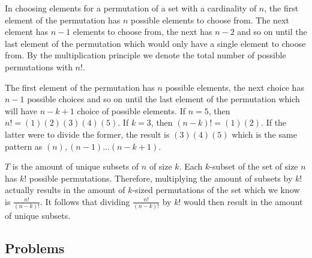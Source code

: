 \documentclass[12pt]{report}
\begin{document}
In choosing elements for a permutation of a set with a cardinality of $n$, the first element of the permutation has $n$ possible elements to choose from. The next element has $n-1$ elements to choose from, the next has $n-2$ and so on until the last element of the permutation which would only have a single element to choose from. By the multiplication principle we denote the total number of possible permutations with $n!$.\medskip

\medskip

The first element of the permutation has $n$ possible elements, the next choice has $n-1$ possible choices and so on until the last element of the permutation which will have $n-k+1$ choice of possible elements. If $n=5$, then $n!=(1)(2)(3)(4)(5)$. If $k=3$, then $(n-k)!=(1)(2)$. If the latter were to divide the former, the result is $(3)(4)(5)$ which is the same pattern as $(n),(n-1) \dots (n-k+1)$.\bigskip

\bigskip

$T$ is the amount of unique subsets of $n$ of size $k$. Each $k$-subset of the set of size $n$ has $k!$ possible permutations. Therefore, multiplying the amount of subsets by $k!$ actually results in the amount of $k$-sized permutations of the set which we know is $\frac{n!}{(n-k)!}$. It follows that dividing $\frac{n!}{(n-k)!}$ by $k!$ would then result in the amount of unique subsets.

\subsection{Problems}



\end{document}
